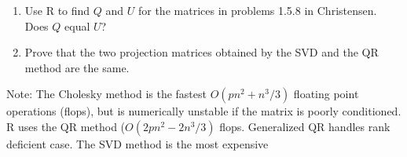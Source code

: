 \documentclass[12pt]{article}
\begin{document}
\begin{enumerate}
\begin{enumerate}
\item Use R to find $Q$ and $U$ for the matrices in problems 1.5.8 in
  Christensen. Does $Q$ equal $U$?
\item Prove that the two projection matrices obtained by the SVD and
  the QR method are the same.  

  \end{enumerate}
Note:  The Cholesky method is the fastest $O(p n^2 + n^3/3)$ floating
point operations (flops), but is numerically unstable if the matrix is
poorly conditioned.  R uses the QR method ($O(2 p n^2 - 2n^3/3)$
flops.  Generalized QR handles rank deficient case.  The SVD method is
the most expensive 
\end{enumerate}
\end{document}
